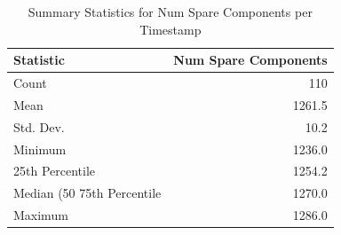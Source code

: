 \begin{table}[htbp]
\centering
\caption{Summary Statistics for Num Spare Components per Timestamp}
\label{tab:contiguity_num_spare_components}
\begin{tabular}{lr}
\toprule
Statistic & Num Spare Components \\
\midrule
Count & 110 \\
Mean & 1261.5 \\
Std. Dev. & 10.2 \\
Minimum & 1236.0 \\
25th Percentile & 1254.2 \\
Median (50%
75th Percentile & 1270.0 \\
Maximum & 1286.0 \\
\bottomrule
\end{tabular}
\end{table}
